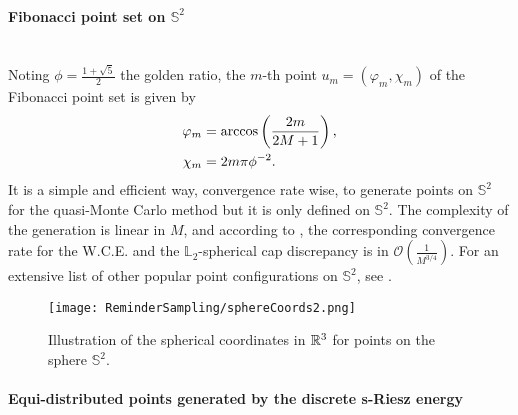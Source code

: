 \paragraph{Fibonacci point set on $\mathbb{S}^2$}\mbox{}\\
 Noting $\phi = \frac{1 + \sqrt{5}}{2}$ the golden 
ratio, {the $m$-th point $u_m = (\varphi_m, \chi_m)$ of the Fibonacci} {point} set is given by
\begin{align*}
\varphi_m &= \text{arccos}\left(\frac{2m}{2M + 1}\right),\\
\chi_m &= 2m\pi \phi^{-2}.
\end{align*}
It is a simple and  efficient way, convergence rate wise, to generate points on $\mathbb{S}^2$ for the quasi-Monte Carlo method {but it} is only defined on $\mathbb{S}^2$. The complexity of the generation is linear in $M$, and according to \citep{Marques2013}, the corresponding convergence rate for the W.C.E. and the $\mathbb{L}_2$-spherical cap discrepancy is in $\mathcal{O}(\frac{1}{M^{3/4}})$. For an extensive list of other popular point configurations on $\mathbb{S}^2$, see \citep{hardin2016comparison}. 


\begin{figure}[!h]
\begin{center}
\texttt{[image: ReminderSampling/sphereCoords2.png]}
\caption{Illustration of the spherical coordinates in $\mathbb{R}^3$ for points on the sphere $\mathbb{S}^2$.}
\label{fig:sphericalcoord}
\end{center}
\end{figure}


\paragraph{Equi-distributed points generated by the discrete s-Riesz energy} \label{par:Riesz} \mbox{}\\

